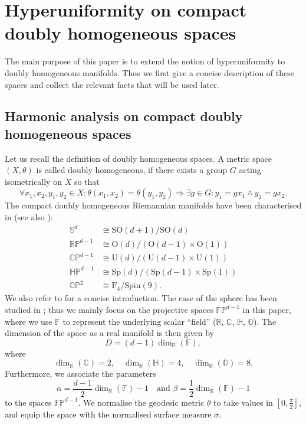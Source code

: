 \section{Hyperuniformity on compact doubly homogeneous
  spaces}\label{sec:hyper-comp-doubly}
The main purpose of this paper is to extend the notion of hyperuniformity to
doubly homogeneous manifolds. Thus we first give a concise description of these
spaces and collect the relevant facts that will be used later.
\subsection{Harmonic analysis on compact doubly homogeneous
  spaces}
\label{sec:comp-doubly-homog}
Let us recall the definition of doubly homogeneous spaces. A metric space
$(X,\theta)$ is called doubly homogeneous, if there exists a group $G$ acting
isometrically on $X$ so that
\begin{equation*}
  \forall x_1,x_2,y_1,y_2\in X: \theta(x_1,x_2)=\theta(y_1,y_2)\Rightarrow
  \exists g\in G: y_1=gx_1\wedge y_2=gx_2.
\end{equation*}
The compact doubly homogeneous Riemannian manifolds have been characterised in
\cite{Wang1952:Two_Point_Compact} (see also
\cite{Helgason2000:Groups_geometric_analysis}):
\begin{align*}
  \mathbb{S}^d&\cong \mathrm{SO}(d+1)/\mathrm{SO}(d)\\
  \mathbb{RP}^{d-1}&\cong\mathrm{O}(d)/(\mathrm{O}(d-1)\times \mathrm{O}(1))\\
  \mathbb{CP}^{d-1}&\cong\mathrm{U}(d)/(\mathrm{U}(d-1)\times \mathrm{U}(1))\\
  \mathbb{HP}^{d-1}&\cong\mathrm{Sp}(d)/(\mathrm{Sp}(d-1)\times
  \mathrm{Sp}(1))\\
  \mathbb{OP}^2&\cong\mathrm{F}_4/\mathrm{Spin}(9).
\end{align*}
We also refer to \cite{Anderson_Dostert_Grabner+2023:riesz_green_energy} for
a concise introduction. The case of the sphere has been studied in
\cite{Brauchart_Grabner_Kusner+2020:hyperuniform_point_sets,
  Brauchart_Grabner_Kusner2019:hyperuniform_deterministic}; thus we mainly
focus on the projective spaces $\mathbb{FP}^{d-1}$ in this paper, where we use
$\mathbb{F}$ to represent the underlying scalar ``field'' ($\mathbb{R}$,
$\mathbb{C}$, $\mathbb{H}$, $\mathbb{O}$). The dimension of the space as a real
manifold is then given by
\begin{equation*}
  D=(d-1)\dim_{\mathbb{R}}(\mathbb{F}),
\end{equation*}
where
\begin{equation*}
  \dim_{\mathbb{R}}(\mathbb{C})=2,\quad
  \dim_{\mathbb{R}}(\mathbb{H})=4,\quad \dim_{\mathbb{R}}(\mathbb{O})=8. 
\end{equation*}
Furthermore, we associate the parameters
\begin{equation*}
  \alpha=\frac{d-1}2\dim_{\mathbb{R}}(\mathbb{F})-1\quad\text{and }
  \beta=\frac12\dim_{\mathbb{R}}(\mathbb{F})-1
\end{equation*}
to the spaces $\mathbb{FP}^{d-1}$. We normalise the geodesic metric $\theta$ to
take values in $[0,\frac\pi2]$, and equip the space with the normalised surface
measure $\sigma$.

